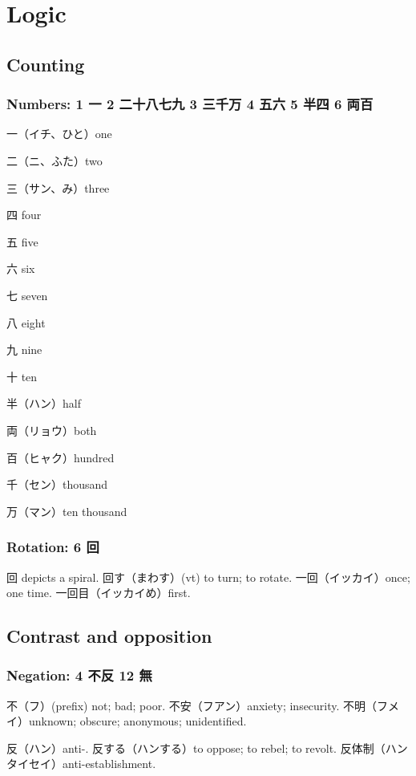 \chapter{Logic}

\section{Counting}

\subsection{Numbers: 1 一 2 二十八七九 3 三千万 4 五六 5 半四 6 両百}

一（イチ、ひと）one

二（ニ、ふた）two

三（サン、み）three

四 four

五 five

六 six

七 seven

八 eight

九 nine

十 ten

半（ハン）half

両（リョウ）both

百（ヒャク）hundred

千（セン）thousand

万（マン）ten thousand

\subsection{Rotation: 6 回}

回 depicts a spiral.
回す（まわす）(vt) to turn; to rotate.
一回（イッカイ）once; one time.
一回目（イッカイめ）first.

\section{Contrast and opposition}

\subsection{Negation: 4 不反 12 無}

不（フ）(prefix) not; bad; poor.
不安（フアン）anxiety; insecurity.
不明（フメイ）unknown; obscure; anonymous; unidentified.

反（ハン）anti-.
反する（ハンする）to oppose; to rebel; to revolt.
反体制（ハンタイセイ）anti-establishment.

